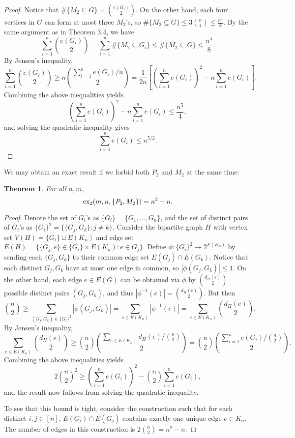 \documentclass[10pt, reqno]{report}
\newtheorem{theorem}{Theorem}[chapter]
\newcommand*{\dex}{\textnormal{ex}_2}
\begin{document}
\begin{proof}
  Notice that $\#\{M_2 \subseteq G\} = \binom{e(G_i)}{2}$. On the other hand, each four vertices in $G$ can form at most three $M_2$'s, so $\#\{M_2 \subseteq G\} \leq 3\binom{n}{4} \leq \frac{n^4}{8}$. By the same argument as in Theorem 3.4, we have 
  \[
    \sum_{i = 1}^n \binom{e(G_i)}{2} = \sum_{i = 1}^n \#\{M_2 \subseteq G_i\} \leq \#\{M_2 \subseteq G\} \leq \frac{n^4}{8}.
  \]
  By Jensen's inequality,
  \[
    \sum_{i = 1}^n \binom{e(G_i)}{2} \geq n\binom{\sum_{i = 1}^n e(G_i)/n}{2} = \frac{1}{2n}\left[\left(\sum_{i = 1}^n e(G_i)\right)^2 - n\sum_{i = 1}^n e(G_i)\right].
  \]
  Combining the above inequalities yields
  \[
    \left(\sum_{i = 1}^n e(G_i)\right)^2 - n\sum_{i = 1}^n e(G_i) \leq \frac{n^5}{4},
  \]
  and solving the quadratic inequality gives
  \[
    \sum_{i = 1}^n e(G_i) \leq n^{5/2}.
  \]
\end{proof}

We may obtain an exact result if we forbid both $P_2$ and $M_2$ at the same time:

\begin{theorem}
  For all $n, m$,
  \[
    \dex(m, n, \{P_2, M_2\}) = n^2 - n.
  \]
\end{theorem}

\begin{proof}
  Denote the set of $G_i$'s as $\{G_i\} = \{G_1, \ldots, G_n\}$, and the set of distinct pairs of $G_i$'s as $\{G_i\}^2 = \{\{G_j, G_k\} : j \neq k\}$. Consider the bipartite graph $H$ with vertex set $V(H) = \{G_i\} \sqcup E(K_n)$ and edge set $E(H) = \{\{G_j, e\} \in \{G_i\} \times E(K_n) : e \in G_j\}$. Define $\phi: \{G_i\}^2 \to 2^{E(K_n)}$ by sending each $\{G_j, G_k\}$ to their common edge set $E(G_j) \cap E(G_k)$. Notice that each distinct $G_j, G_k$ have at most one edge in common, so $|\phi(G_j, G_k)| \leq 1$. On the other hand, each edge $e \in E(G)$ can be obtained via $\phi$ by $\binom{d_H(e)}{2}$ possible distinct pairs $(G_j, G_k)$, and thus $|\phi^{-1}(e)| = \binom{d_H(e)}{2}$. But then
  \[
    \binom{n}{2} \geq \sum_{(G_j, G_k) \in \{G_i\}^2} |\phi(G_j, G_k)| = \sum_{e \in E(K_n)} |\phi^{-1}(e)| = \sum_{e \in E(K_n)} \binom{d_H(e)}{2}.
  \]
  By Jensen's inequality,
  \[
    \sum_{e \in E(K_n)} \binom{d_H(e)}{2} \geq \binom{n}{2}\binom{\sum_{e \in E(K_n)} d_H(e)/\binom{n}{2}}{2} = \binom{n}{2}\binom{\sum_{i = 1}^n e(G_i)/\binom{n}{2}}{2}.
  \]
  Combining the above inequalities yields
  \[
    2\binom{n}{2}^2 \geq \left(\sum_{i = 1}^n e(G_i)\right)^2 - \binom{n}{2}\sum_{i = 1}^n e(G_i),
  \]
  and the result now follows from solving the quadratic inequality.

  To see that this bound is tight, consider the construction such that for each distinct $i, j \in [n]$, $E(G_i) \cap E(G_j)$ contains exactly one unique edge $e \in K_n$. The number of edges in this construction is $2\binom{n}{2} = n^2 - n$.
\end{proof}
\end{document}
